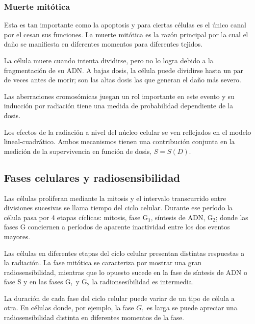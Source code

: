 \documentclass[12pt,letterpaper, oneside]{book}
\begin{document}
			\subsubsection{Muerte mitótica}
			Esta es tan importante como la apoptosis y para ciertas células es el único canal por el cesan sus funciones\cite{Hall.2000}. La muerte mitótica es la razón principal por la cual el daño se manifiesta en diferentes momentos para diferentes tejidos\cite{Bleehen.2007}. 
			
			La célula muere cuando intenta dividirse, pero no lo logra debido a la fragmentación de su ADN\cite{Hall.2000, Bleehen.2007}. A bajas dosis, la célula puede dividirse hasta un par de veces antes de morir; son las altas dosis las que generan el daño más severo\cite{Bleehen.2007}. 
			
			Las aberraciones cromosómicas juegan un rol importante en este evento y su inducción por radiación tiene una medida de probabilidad dependiente de la dosis\cite{Hall.2000}. 
			
			Los efectos de la radiación a nivel del núcleo celular se ven reflejados en el modelo lineal-cuadrático. Ambos mecanismos tienen una contribución conjunta en la medición de la supervivencia en función de dosis, $S=S(D)$\cite{Hall.2000}.
			
		\subsection{Fases celulares y radiosensibilidad}
		Las células proliferan mediante la mitosis y el intervalo transcurrido entre divisiones sucesivas se llama tiempo del ciclo celular\cite{Hall.2000}. Durante ese período la célula pasa por 4 etapas cíclicas: mitosis, fase $\textrm{G}_1$, síntesis de ADN, $\textrm{G}_2$; donde las fases G conciernen a períodos de aparente inactividad entre los dos eventos mayores\cite{Hall.2000}.
		
		Las células en diferentes etapas del ciclo celular presentan distintas respuestas a la radiación\cite{Bleehen.2007, Tubiana.1990}. La fase mitótica se caracteriza por mostrar una gran radiosensibilidad, mientras que lo opuesto sucede en la fase de síntesis de ADN o fase S y en las fases $\textrm{G}_1$ y $\textrm{G}_2$ la radionsesibilidad es intermedia\cite{Bleehen.2007}. 
		
		La duración de cada fase del ciclo celular puede variar de un tipo de célula a otra\cite{Hall.2000, Bleehen.2007}. En células donde, por ejemplo, la fase $G_1$ es larga se puede apreciar una radiosensibilidad distinta en diferentes momentos de la fase\cite{Bleehen.2007}.	
		
\end{document}

